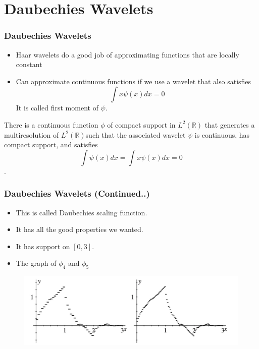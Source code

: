 \documentclass{beamer}
\begin{document}
\section{Daubechies Wavelets} %
\begin{frame}
\frametitle{Daubechies Wavelets}

\begin{itemize}
    \item Haar wavelets do a good job of approximating functions that are locally constant
    \item Can approximate continuous functions if we use a wavelet that also satisfies $$\int x\psi(x) dx = 0$$ It is called first moment of $\psi$.
\end{itemize}

\begin{theorem}[15.5.1]
    There is a continuous function $\phi$ of compact support in $L^2(\mathbb{R}) $
    that generates a multiresolution of $L^2(\mathbb{R}) $such that the associated wavelet $\psi$ is continuous, 
    has compact support, and satisfies $$\int \psi(x) dx = \int x\psi(x) dx = 0$$.
\end{theorem}

\end{frame}

\begin{frame}
    \frametitle{Daubechies Wavelets (Continued..)}
    
    \begin{itemize}
        \item This is called Daubechies scaling function.
        \item It has all the good properties we wanted.
        \item It has support on $[0,3]$.
        \item The graph  of $\phi_4$ and $\phi_5$
    \end{itemize}

    \begin{figure}
        \includegraphics[width=0.8\linewidth]{daubechies.jpg}
    \end{figure}
    
\end{frame}
    
\end{document}
